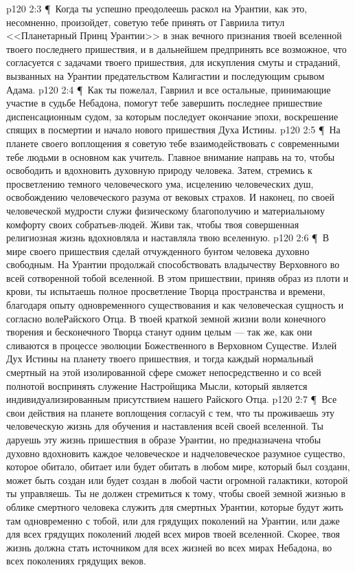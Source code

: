 \vs p120 2:3 \P\ \bibnobreakspace Когда ты успешно преодолеешь раскол на Урантии, как это, несомненно, произойдет, советую тебе принять от Гавриила титул <<Планетарный Принц Урантии>> в знак вечного признания твоей вселенной твоего последнего пришествия, и в дальнейшем предпринять все возможное, что согласуется с задачами твоего пришествия, для искупления смуты и страданий, вызванных на Урантии предательством Калигастии и последующим срывом Адама.
\vs p120 2:4 \P\ \bibnobreakspace Как ты пожелал, Гавриил и все остальные, принимающие участие в судьбе Небадона, помогут тебе завершить последнее пришествие диспенсационным судом, за которым последует окончание эпохи, воскрешение спящих в посмертии и начало нового пришествия Духа Истины.
\vs p120 2:5 \P\ \bibnobreakspace На планете своего воплощения я советую тебе взаимодействовать с современными тебе людьми в основном как учитель. Главное внимание направь на то, чтобы освободить и вдохновить духовную природу человека. Затем, стремись к просветлению темного человеческого ума, исцелению человеческих душ, освобождению человеческого разума от вековых страхов. И наконец, по своей человеческой мудрости служи физическому благополучию и материальному комфорту своих собратьев\hyp{}людей. Живи так, чтобы твоя совершенная религиозная жизнь вдохновляла и наставляла твою вселенную.
\vs p120 2:6 \P\ \bibnobreakspace В мире своего пришествия сделай отчужденного бунтом человека духовно свободным. На Урантии продолжай способствовать владычеству Верховного во всей сотворенной тобой вселенной. В этом пришествии, приняв образ из плоти и крови, ты испытаешь полное просветление Творца пространства и времени, благодаря опыту одновременного существования и как человеческая сущность и согласно волеРайского Отца. В твоей краткой земной жизни воли конечного творения и бесконечного Творца станут одним целым --- так же, как они сливаются в процессе эволюции Божественного в Верховном Существе. Излей Дух Истины на планету твоего пришествия, и тогда каждый нормальный смертный на этой изолированной сфере сможет непосредственно и со всей полнотой воспринять служение Настройщика Мысли, который является индивидуализированным присутствием нашего Райского Отца.
\vs p120 2:7 \P\ \bibnobreakspace Все свои действия на планете воплощения согласуй с тем, что ты проживаешь эту человеческую жизнь для обучения и наставления всей своей вселенной. Ты даруешь эту жизнь пришествия в образе  Урантии, но предназначена  чтобы духовно вдохновить каждое человеческое и надчеловеческое разумное существо, которое обитало, обитает или будет обитать в любом мире, который был созданн, может быть создан или будет создан в любой части огромной галактики, которой ты управляешь. Ты не должен стремиться к тому, чтобы своей земной жизнью в облике смертного человека служить  для смертных Урантии, которые будут жить там одновременно с тобой, или для грядущих поколений на Урантии, или даже для всех грядущих поколений людей всех миров твоей вселенной. Скорее, твоя жизнь должна стать источником  для всех жизней во всех мирах Небадона, во всех поколениях грядущих веков.
